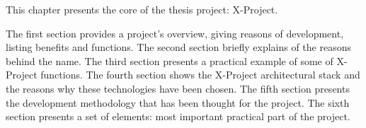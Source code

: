 This chapter presents the core of the thesis project: X-Project.

The first section provides a project's overview, giving reasons of development, listing benefits and functions. The second section briefly explains of the reasons behind the name. The third section presents a practical example of some of X-Project functions. The fourth section shows the X-Project architectural stack and the reasons why these technologies have been chosen. The fifth section presents the development methodology that has been thought for the project. The sixth section presents a set of elements: most important practical part of the project.